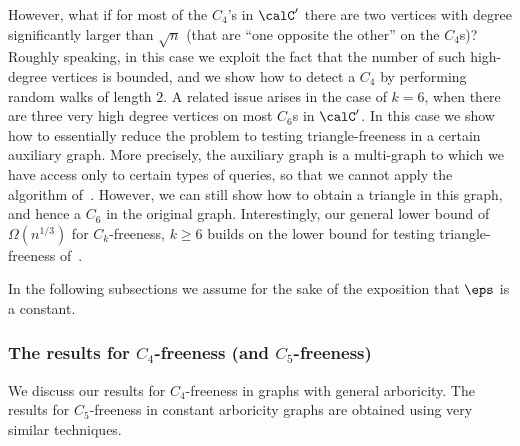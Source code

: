 However, what if for most of the $C_4$'s in $\calC'$ there are two vertices with degree significantly larger than $\sqrt{n}$ (that are ``one opposite the other'' on the $C_4$s)? Roughly speaking, in this case we exploit the fact that the number of such high-degree vertices is bounded, and we show how to detect a $C_4$ by performing random walks of length $2$. A related issue arises in the case of $k=6$, when there are three very high degree vertices on most $C_6$s in $\calC'$. In this case we show how to essentially reduce the problem to testing triangle-freeness in a certain auxiliary graph. 
%
More precisely, the auxiliary graph is a multi-graph to which we have access only to certain types of queries, so that we cannot apply the algorithm of~\cite{AKKR08}. However, we can still show how to obtain a triangle in this graph, and hence a $C_6$ in the original graph. Interestingly, our general lower bound of $\Omega(n^{1/3})$ for $C_k$-freeness, $k\geq 6$ builds on the lower bound for testing triangle-freeness of~\cite{AKKR08}.


\smallskip
In the following subsections we assume for the sake of the exposition that $\eps$ is a constant. 



\subsubsection{The  results for $C_4$-freeness (and $C_5$-freeness)}
We discuss our results for $C_4$-freeness in graphs with general arboricity. 
The results for $C_5$-freeness in constant arboricity graphs are obtained using very similar techniques. 

